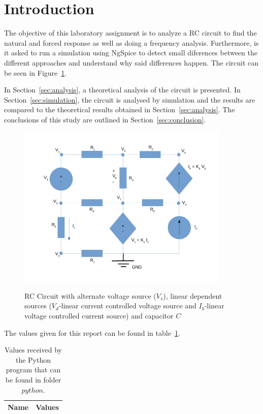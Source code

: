 \newpage
\section{Introduction}
\label{sec:introduction}


The objective of this laboratory assignment is to analyze a RC circuit to find the natural and forced response as well as doing a frequency analysis. Furthermore, is it asked to run a simulation using NgSpice to detect small diferences between the different approaches and understand why said differences happen. The circuit can be seen in Figure~\ref{fig:circuit}.

In Section~\ref{sec:analysis}, a theoretical analysis of the circuit is
presented. In Section~\ref{sec:simulation}, the circuit is analysed by
simulation and the results are compared to the theoretical results obtained in
Section~\ref{sec:analysis}. The conclusions of this study are outlined in
Section~\ref{sec:conclusion}.

\begin{figure}[!ht] \centering
\caption{RC Circuit with alternate voltage source ($V_s$), linear dependent sources ($V_d$-linear current controlled voltage source and $I_b$-linear voltage controlled current source) and capacitor $C$}
\squeezeup 
\includegraphics[width=0.9\textwidth, scale=1.0]{circuit.pdf}
\squeezeup 
\squeezeup 
\squeezeup 
\squeezeup 
\label{fig:circuit}
\end{figure}
The values given for this report can be found in table~\ref{tab:op1}.

\begin{table}[hb]
  \centering
  \begin{tabular}{|l|r|}
    \hline    
    {\bf Name} & {\bf Values} \\ \hline
    
  \end{tabular}
  \caption{Values received by the Python program that can be found in folder $python$.}
  \label{tab:op1}
\end{table}


